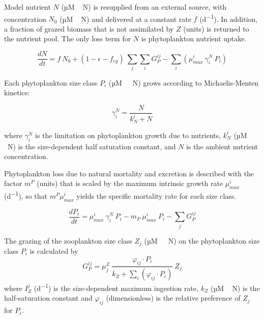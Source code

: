 \documentclass[gmd, manuscript]{copernicus}
\begin{document}
Model nutrient $N$ (\unit{µM\,N}) is resupplied from an external source, with concentration $N_0$ (\unit{µM\,N}) and delivered at a constant rate $f$ (\unit{d^{-1}}). In addition, a fraction of grazed biomass that is not assimilated by $Z$ (units) is returned to the nutrient pool. The only loss term for $N$ is phytoplankton nutrient uptake.

\begin{equation}
    \label{Eq:BanasNut}
    \frac{d N}{d t} = 
    f \ N_0 %
    +  (1- \epsilon - f_{eg}) \ \sum_{j} \sum_{i} G_P^{ij} %
    - \sum_{i} ( \mu_{max}^i \ \gamma_i^N \ P_i) %
\end{equation}

Each phytoplankton size class $P_i$ (\unit{µM \ N}) grows according to Michaelis-Menten kinetics:

\begin{equation}
    \gamma_i^N =  \frac{N}{k_N^i + N} 
\end{equation}

where $\gamma_i^N$ is the limitation on phytoplankton growth due to nutrients, $k_N^i$ (\unit{µM\,N}) is the size-dependent half saturation constant, and $N$ is the ambient nutrient concentration.

Phytoplankton loss due to natural mortality and excretion is described with the factor $m^P$ (units) that is scaled by the maximum intrinsic growth rate $\mu_{max}^i$ (\unit{d^{-1}}), so that $m^P \mu_{max}^i$ yields the specific mortality rate for each size class.

\begin{equation}
    \label{Eq:BanasPhyto}
    \frac{d P_i}{d t} =
    \mu_{max}^i \  \gamma_i^N \   P_i  %
    - m_P  \ \mu_{max}^i \ P_i %
    - \sum_{j} G_P^{ij} %
\end{equation}


The grazing of the zooplankton size class $Z_j$ (\unit{µM \ N}) on the phytoplankton size class $P_i$ is calculated by
\begin{equation}
    G_P^{ij} = \mu_j^Z \ \frac{ \varphi_{ij} \cdot P_i }{ k_Z + \sum_{i}(\varphi_{ij} \cdot P_i) } \ Z_j
\end{equation}
where $I_Z^j$ (\unit{d^{-1}}) is the size-dependent maximum ingestion rate, $k_Z$ (\unit{µM\,N}) is the half-saturation constant and $\varphi_{ij}$ (dimensionless) is the relative preference of $Z_j$ for $P_i$.
\end{document}
